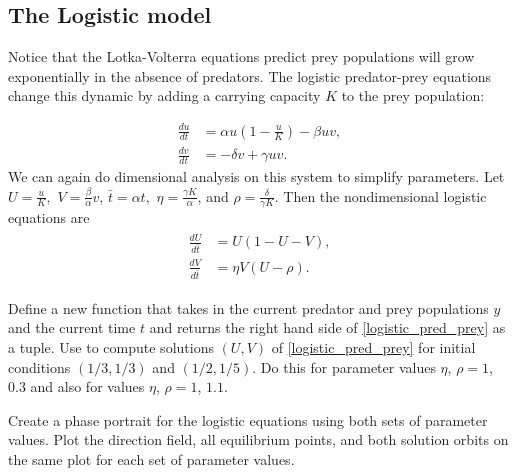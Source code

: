 \subsection*{The Logistic model}
Notice that the Lotka-Volterra equations predict prey populations will grow exponentially in the absence of predators. The logistic predator-prey equations change this dynamic by adding a carrying capacity $K$ to the prey population:%

\begin{align*}
	\frac{du}{dt} &= \alpha u\left(1 -\frac{u}{K}\right) - \beta uv,\\
	\frac{dv}{dt} &= -\delta v + \gamma uv.
\end{align*}
We can again do dimensional analysis on this system to simplify parameters. Let $U = \frac{u}{K},$ $V = \frac{\beta}{\alpha}v$, $\bar{t} = \alpha t,$  $\eta = \frac{\gamma K}{\alpha}$, and $\rho = \frac{\delta}{\gamma K}$.
Then the nondimensional logistic equations are
\begin{align}
	\begin{split}
	\frac{dU}{d\bar{t}} &= U(1-U-V),\\
	\frac{dV}{d\bar{t}} &= \eta V (U-\rho).
	\end{split} \label{logistic_pred_prey}
\end{align}

\begin{problem}
Define a new function  that takes in the current predator and prey populations $y$ and the current time $t$ and returns the right hand side of \eqref{logistic_pred_prey} as a tuple. Use  to compute solutions $(U,V)$ of \eqref{logistic_pred_prey}
for initial conditions $(1/3, 1/3)$ and $(1/2, 1/5)$.
Do this for parameter values $\eta$, $\rho = 1$, $0.3$ and also for values $\eta$, $\rho = 1$, $1.1$.

Create a phase portrait for the logistic equations using both sets of parameter values.
Plot the direction field, all equilibrium points, and both solution orbits on the same plot for each set of parameter values.
\end{problem} 

